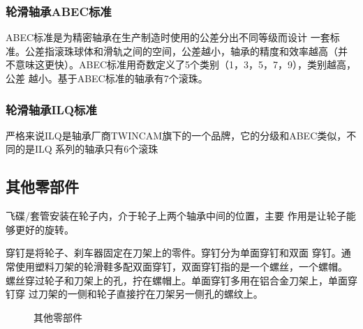 \documentclass[12pt]{ctexart}
\begin{document}
\subsubsection{轮滑轴承ABEC标准}
  ABEC标准\cite{wiki:abec}是为精密轴承在生产制造时使用的公差分出不同等级而设计
  一套标准。公差指滚珠球体和滑轨之间的空间，公差越小，轴承的精度和效率越高（并
  不意味这更快）。ABEC标准用奇数定义了5个类别（1，3，5，7，9），类别越高，公差
  越小。基于ABEC标准的轴承有7个滚珠。

\subsubsection{轮滑轴承ILQ标准}
  严格来说ILQ是轴承厂商TWINCAM旗下的一个品牌，它的分级和ABEC类似，不同的是ILQ
  系列的轴承只有6个滚珠

\subsection{其他零部件}
\begin{paracol}{2}
  飞碟/套管安装在轮子内，介于轮子上两个轴承中间的位置，主要
  作用是让轮子能够更好的旋转。

  穿钉是将轮子、刹车器固定在刀架上的零件。穿钉分为单面穿钉和双面
  穿钉。通常使用塑料刀架的轮滑鞋多配双面穿钉，双面穿钉指的是一个螺丝，一个螺帽。
  螺丝穿过轮子和刀架上的孔，拧在螺帽上。单面穿钉多用在铝合金刀架上，单面穿钉穿
  过刀架的一侧和轮子直接拧在刀架另一侧孔的螺纹上。
\begin{rightcolumn}
\begin{figure}[tb]
\centering
{}
\caption{其他零部件}
\end{figure}
\end{rightcolumn}
\end{paracol}
\end{document}
